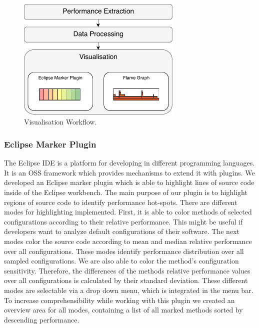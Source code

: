 \begin{figure}[h]
  \centering
  \includegraphics[width=0.7\textwidth]{images/workflow_visual_expanded}
  \caption{Visualisation Workflow.}
  \label{data_vis_workflow}
\end{figure}


\subsubsection{Eclipse Marker Plugin}

The Eclipse IDE is a platform for developing in different programming languages. It is an \ac{OSS} framework which provides mechanisms to extend it with plugins. We developed an Eclipse marker plugin which is able to highlight lines of source code inside of the Eclipse workbench. The main purpose of our plugin is to highlight regions of source code to identify performance hot-spots. There are different modes for highlighting implemented. First, it is able to color methods of selected configurations according to their relative performance. This might be useful if developers want to analyze default configurations of their software. The next modes color the source code according to mean and median relative performance over all configurations. These modes identify performance distribution over all sampled configurations. We are also able to color the method's configuration sensitivity. Therefore, the differences of the methods relative performance values over all configurations is calculated by their standard deviation. These different modes are selectable via a drop down menu, which is integrated in the menu bar. To increase comprehensibility while working with this plugin we created an overview area for all modes, containing a list of all marked methods sorted by descending performance. 

